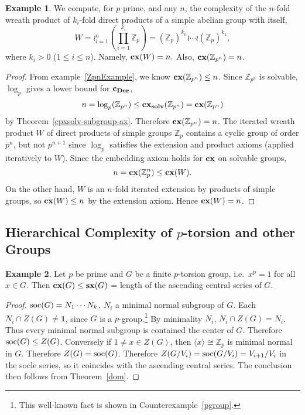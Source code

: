 \documentclass[a4paper,11pt]{amsart}
\theoremstyle{definition}
\newtheorem{example}{Example}
\newcommand{\cx}{\mbox{\bf cx}}
\renewcommand{\c}{\mbox{\bf c}}
\newcommand{\sx}{{\bf sx}}
\newcommand{\Der}{{\bf Der}}
\newcommand{\solv}{{\bf solv}}
\newcommand{\soc}{\mbox{\rm soc}}
\newcommand{\Z}{\mathbb{Z}}
\newcommand{\1}{{\mathbf 1}}
\begin{document}
\begin{example} \label{Zpwr} 
We compute, for $p$ prime, and any $n$, the complexity of the $n$-fold wreath product of $k_i$-fold direct products of a simple abelian group with itself,
$$W=\wr_{i=1}^n (\prod_{i=1}^{k_i} \Z_p)=(\Z_p)^{k_n}\wr \cdots \wr (\Z_p)^{k_1},$$
where $k_i>0$ ($1\leq i \leq n$).
Namely, $\cx (W) = n.$ Also, $\cx(\Z_{p^n})=n$.
\end{example}
\begin{proof} From example~\ref{ZpnExample}, we know $\cx(\Z_{p^n}) \leq n$. Since $\Z_{p^n}$ is solvable, $\log_p$ gives a lower bound for  $\c_\Der$, 
$$n=\log_p(\Z_{p^n}) \leq \cx_\solv(\Z_{p^n}) = \cx(\Z_{p^n})$$ by Theorem~\ref{cpxsolv-subgroup-ax}.
Therefore $\cx(\Z_{p^n})=n$.
The iterated wreath product $W$ of direct products of simple groups $\Z_p$ contains a cyclic group of order $p^n$, but not $p^{n+1}$ since
$\log_p$ satisfies the extension and product axioms (applied iteratively to $W$). 
Since the embedding axiom holds for $\cx$  on solvable groups,
$$n=\cx(\Z_p^{n})\leq \cx(W).$$
 On the other hand, $W$
is an $n$-fold iterated extension by products of simple groups, so $\cx(W) \leq n$ by the extension axiom. Hence $\cx(W)=n$.
\end{proof}


\subsection{Hierarchical Complexity of $p$-torsion and other Groups}

\begin{example}\label{ptorsion}
Let $p$ be prime and $G$ be a finite $p$-torsion group, i.e.\ $x^p=1$ for all $x\in G$. Then $\cx(G) \leq \sx(G)$ = length of the ascending central series of $G$.  
\end{example}

\begin{proof} $\soc(G)=N_1\cdots N_k$, $N_i$ a minimal normal subgroup of $G$.  Each $N_i \cap Z(G) \neq \1$, since $G$ is a $p$-group.\footnote{This well-known fact is shown in Counterexample~\ref{pgroup}.} By minimality $N_i$,  $N_i\cap Z(G)=N_i$.  Thus every minimal normal subgroup is contained the center of $G$. Therefore $\soc(G)\leq Z(G)$. Conversely if $1\neq x\in Z(G)$, then 
$\langle x \rangle \cong \Z_p$ is minimal normal in $G$.  
Therefore $Z(G)=\soc(G)$. Therefore $Z(G/V_i)=\soc(G/V_i)=V_{i+1}/V_i$ in the socle series, so it coincides with the ascending central series.
The conclusion then follows from Theorem~\ref{dom}.\end{proof}
\end{document}
